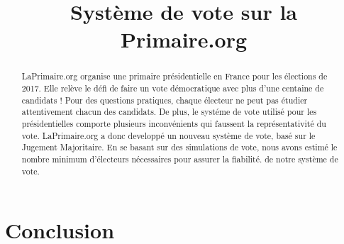 \documentclass[conference]{IEEEtran}
\title{Syst\`eme de vote sur la Primaire.org}
\author{
    \IEEEauthorblockN{Pierre-Louis Guhur, Thibauld Favre}
}
\newcommand*{\rootPath}{./}
\begin{document}
  
  
\maketitle


\begin{abstract} %
LaPrimaire.org organise une primaire pr\'esidentielle en France pour les \'elections de 2017. Elle rel\`eve le d\'efi de faire un vote d\'emocratique avec plus d'une centaine de candidats ! Pour des questions pratiques, chaque \'electeur ne peut pas \'etudier attentivement chacun des candidats. De plus, le syst\'eme de vote utilis\'e pour les pr\'esidentielles comporte plusieurs inconv\'enients qui faussent la repr\'esentativit\'e du vote. LaPrimaire.org a donc developp\'e un nouveau syst\`eme de vote, bas\'e sur le Jugement Majoritaire. 
En se basant sur des simulations de vote, nous avons estim\'e le nombre minimum d'\'electeurs n\'ecessaires pour assurer la fiabilit\'e. de  notre syst\`eme de vote. %
\end{abstract}











\section{Conclusion}





\ifstandalone
	
	
\fi
\end{document}
